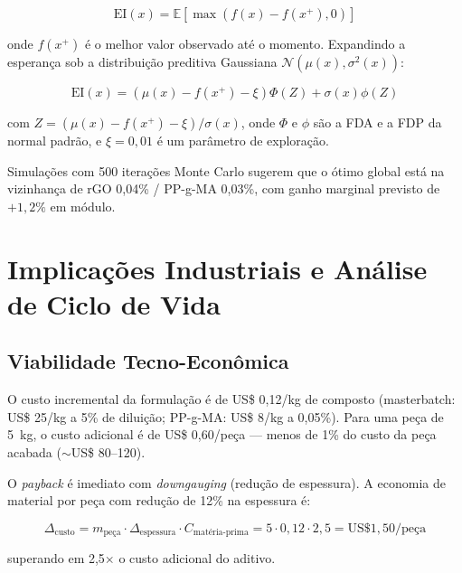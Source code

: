 \documentclass[12pt,a4paper,twoside]{article}
\begin{document}
\begin{equation}
\text{EI}(x) = \mathbb{E}[\max(f(x) - f(x^+), 0)]
\label{eq:expected_improvement}
\end{equation}

onde $f(x^+)$ é o melhor valor observado até o momento. Expandindo a esperança sob a distribuição preditiva Gaussiana $\mathcal{N}(\mu(x), \sigma^2(x))$:

\begin{equation}
\text{EI}(x) = (\mu(x) - f(x^+) - \xi) \Phi(Z) + \sigma(x) \phi(Z)
\label{eq:ei_closed}
\end{equation}

com $Z = (\mu(x) - f(x^+) - \xi) / \sigma(x)$, onde $\Phi$ e $\phi$ são a FDA e a FDP da normal padrão, e $\xi = 0,01$ é um parâmetro de exploração.

Simulações com 500 iterações Monte Carlo sugerem que o ótimo global está na vizinhança de rGO 0,04\% / PP-g-MA 0,03\%, com ganho marginal previsto de $+1,2\%$ em módulo.

\section{Implicações Industriais e Análise de Ciclo de Vida}

\subsection{Viabilidade Tecno-Econômica}

O custo incremental da formulação é de US\$ 0,12/kg de composto (masterbatch: US\$ 25/kg a 5\% de diluição; PP-g-MA: US\$ 8/kg a 0,05\%). Para uma peça de \SI{5}{kg}, o custo adicional é de US\$ 0,60/peça — menos de 1\% do custo da peça acabada ($\sim$US\$ 80--120).

O \textit{payback} é imediato com \textit{downgauging} (redução de espessura). A economia de material por peça com redução de 12\% na espessura é:

\begin{equation}
\Delta_{\text{custo}} = m_{\text{peça}} \cdot \Delta_{\text{espessura}} \cdot C_{\text{matéria-prima}} = 5 \cdot 0,12 \cdot 2,5 = \text{US\$ } 1,50/\text{peça}
\label{eq:downgauging}
\end{equation}

superando em 2,5$\times$ o custo adicional do aditivo.
\end{document}
